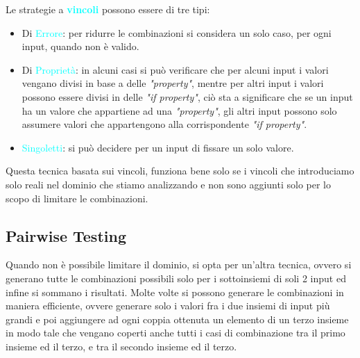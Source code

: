Le strategie a \textbf{\textcolor{cyan}{vincoli}} possono essere di tre tipi:
\begin{itemize}
    \item Di \textcolor{cyan}{Errore}: per ridurre le combinazioni si considera
        un solo caso, per ogni input, quando non è valido.
    \item Di \textcolor{cyan}{Proprietà}: in alcuni casi si può verificare che per alcuni input
        i valori vengano divisi in base a delle \emph{"property"}, mentre per altri input i valori
        possono essere divisi in delle \emph{"if property"}, ciò sta a significare che se un input ha un
        valore che appartiene ad una \emph{"property"}, gli altri input possono solo assumere valori
        che appartengono alla corrispondente \emph{"if property"}.
    \item \textcolor{cyan}{Singoletti}: si può decidere per un input di fissare un solo valore.
\end{itemize}

Questa tecnica basata sui vincoli, funziona bene solo se i vincoli che introduciamo
solo reali nel dominio che stiamo analizzando e non sono aggiunti solo per lo scopo di
limitare le combinazioni.

\subsection{Pairwise Testing}

Quando non è possibile limitare il dominio, si opta per un'altra tecnica,
ovvero si generano tutte le combinazioni possibili solo per i sottoinsiemi di
soli 2 input ed infine si sommano i risultati. Molte volte si possono generare
le combinazioni in maniera efficiente, ovvere generare solo i valori fra i due
insiemi di input più grandi e poi aggiungere ad ogni coppia ottenuta un elemento
di un terzo insieme in modo tale che vengano coperti anche tutti i casi di combinazione
tra il primo insieme ed il terzo, e tra il secondo insieme ed il terzo.